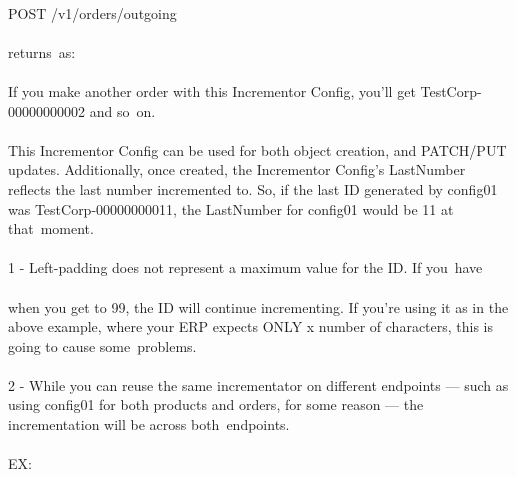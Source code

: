 \documentclass{memoir}%
\begin{document}
%
\paragraph*{}%
POST /v1/orders/outgoing

%
\paragraph*{}%
returns~as:

%
\paragraph*{}%
If you make another order with this Incrementor Config, you’ll get TestCorp{-}00000000002 and so~on. 

%
\paragraph*{}%
This Incrementor Config can be used for both object creation, and PATCH/PUT updates. Additionally, once created, the Incrementor Config’s LastNumber reflects the last number incremented to. So, if the last ID generated by config01 was TestCorp{-}00000000011, the LastNumber for config01 would be 11 at that~moment.

%
\paragraph*{}%
1 {-} Left{-}padding does not represent a maximum value for the ID. If you~have

%
\paragraph*{}%
when you get to 99, the ID will continue incrementing. If you’re using it as in the above example, where your ERP expects ONLY x number of characters, this is going to cause some~problems. 

%
\paragraph*{}%
2 {-} While you can reuse the same incrementator on different endpoints — such as using config01 for both products and orders, for some reason — the incrementation will be across both~endpoints.

%
\paragraph*{}%
EX:
\end{document}
